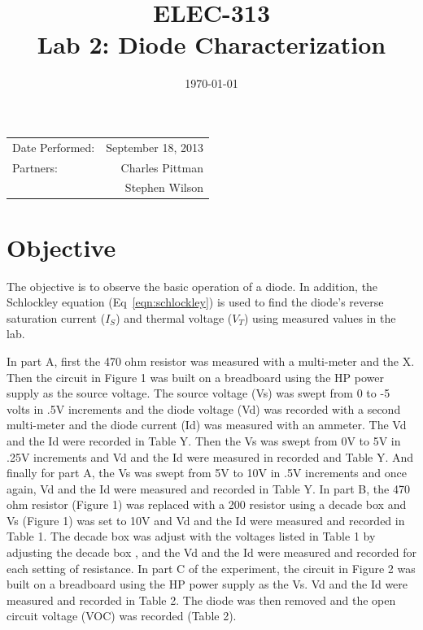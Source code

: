 \documentclass{article}
\author{}
\title{ELEC-313 \\ Lab 2: Diode Characterization \\ }
\date{\today}
\begin{document}
\maketitle

\begin{center}
  \begin{tabular}{lr}
    Date Performed: & September 18, 2013 \\
    Partners: & Charles Pittman \\
    & Stephen Wilson \\
  \end{tabular}
\end{center}

\pagebreak


\renewcommand{\labelenumi}{\alph{enumi}.}

\section{Objective}
\label{sec:objective}

The objective is to observe the basic operation of a diode.  In
addition, the Schlockley equation (Eq~\ref{eqn:schlockley}) is used to
find the diode's reverse saturation current ($I_S$) and thermal
voltage ($V_T$) using measured values in the lab.


In part A, first the 470 ohm resistor was measured with a multi-meter
and the %
X. Then the circuit in Figure 1 was built on a breadboard using the HP
power supply as the source voltage. The source voltage (Vs) was swept
from 0 to -5 volts in .5V increments and the diode voltage (Vd) was
recorded with a second multi-meter and the diode current (Id) was
measured with an ammeter. The Vd and the Id were recorded in Table
Y. Then the Vs was swept from 0V to 5V in .25V increments and Vd and
the Id were measured in recorded and Table Y. And finally for part A,
the Vs was swept from 5V to 10V in .5V increments and once again, Vd
and the Id were measured and recorded in Table Y.  In part B, the 470
ohm resistor (Figure 1) was replaced with a 200 resistor using a
decade box and Vs (Figure 1) was set to 10V and Vd and the Id were
measured and recorded in Table 1. The decade box was adjust with the
voltages listed in Table 1 by adjusting the decade box , and the Vd
and the Id were measured and recorded for each setting of resistance.
In part C of the experiment, the circuit in Figure 2 was built on a
breadboard using the HP power supply as the Vs. Vd and the Id were
measured and recorded in Table 2. The diode was then removed and the
open circuit voltage (VOC) was recorded (Table 2).
\end{document}
